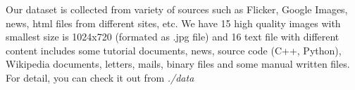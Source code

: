 Our dataset is collected from variety of sources such as Flicker, Google Images, news, html files from different sites, etc. We have 15 high quality images with smallest size is 1024x720 (formated as .jpg file) and 16 text file with different content includes some tutorial documents, news, source code (C++, Python), Wikipedia documents, letters, mails, binary files and some manual written files. For detail, you can check it out from \textit{./data}